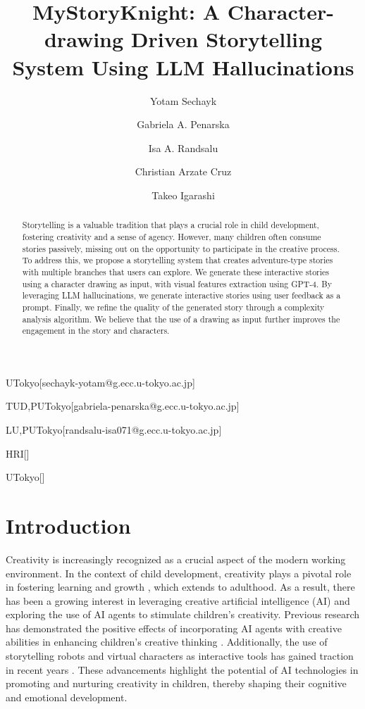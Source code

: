 \documentclass[submit,techrep,english]{ipsj}
\begin{document}
\title{MyStoryKnight: A Character-drawing Driven Storytelling System Using LLM Hallucinations}


\author{Yotam Sechayk}{UTokyo}[sechayk-yotam@g.ecc.u-tokyo.ac.jp]
\author{Gabriela A. Penarska}{TUD,PUTokyo}[gabriela-penarska@g.ecc.u-tokyo.ac.jp]
\author{Isa A. Randsalu}{LU,PUTokyo}[randsalu-isa071@g.ecc.u-tokyo.ac.jp]
\author{Christian Arzate Cruz}{HRI}[]

\author{Takeo Igarashi}{UTokyo}[]


\begin{abstract}
    Storytelling is a valuable tradition that plays a crucial role in child development, fostering creativity and a sense of agency. However, many children often consume stories passively, missing out on the opportunity to participate in the creative process. To address this, we propose a storytelling system that creates adventure-type stories with multiple branches that users can explore. We generate these interactive stories using a character drawing as input, with visual features extraction using GPT-4. By leveraging LLM hallucinations, we generate interactive stories using user feedback as a prompt. Finally, we refine the quality of the generated story through a complexity analysis algorithm. We believe that the use of a drawing as input further improves the engagement in the story and characters.
\end{abstract}

\maketitle

\section{Introduction}
\label{sec:introduction}

Creativity is increasingly recognized as a crucial aspect of the modern working environment. In the context of child development, creativity plays a pivotal role in fostering learning and growth \cite{1:ElgarfP22}, which extends to adulthood. As a result, there has been a growing interest in leveraging creative artificial intelligence (AI) and exploring the use of AI agents to stimulate children's creativity. Previous research has demonstrated the positive effects of incorporating AI agents with creative abilities in enhancing children's creative thinking \cite{1:ElgarfP22}. Additionally, the use of storytelling robots and virtual characters as interactive tools has gained traction in recent years \cite{7:SunLLL17}. These advancements highlight the potential of AI technologies in promoting and nurturing creativity in children, thereby shaping their cognitive and emotional development.
\end{document}
